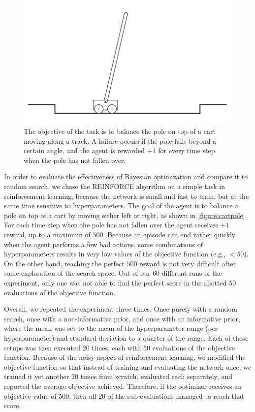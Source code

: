 \begin{figure}[t]
	\begin{center}
		\includegraphics[width=1.0\textwidth]{images/cartpole.png}
		\caption{The objective of the task is to balance the pole on top of a cart moving along
			a track. A failure occurs if the pole falls beyond a certain angle, and the agent
			is rewarded $+1$ for every time step when the pole has not fallen over.}
		\label{figure:cartpole}
	\end{center}
\end{figure}

In order to evaluate the effectiveness of Bayesian optimization and compare it to random search, we chose the REINFORCE algorithm on a simple task in reinforcement learning, because the network is small and fast to train, but at the same time sensitive to hyperparameters. The goal of the agent is to balance a pole on top of a cart by moving either left or right, as shown in \autoref{figure:cartpole}. For each time step when the pole has not fallen over the agent receives $+1$ reward, up to a maximum of $500$. Because an episode can end rather quickly when the agent performs a few bad actions, some combinations of hyperparameters results in very low values of the objective function (e.g., $< 50$). On the other hand, reaching the perfect $500$ reward is not very difficult after some exploration of the search space. Out of our $60$ different runs of the experiment, only one was not able to find the perfect score in the allotted $50$ evaluations of the objective function.

Overall, we repeated the experiment three times. Once purely with a random search, once with a non-informative prior, and once with an informative prior, where the mean was set to the mean of the hyperparameter range (per hyperparameter) and standard deviation to a quarter of the range. Each of these setups was then executed $20$ times, each with $50$ evaluations of the objective function. Because of the noisy aspect of reinforcement learning, we modified the objective function so that instead of training and evaluating the network once, we trained it yet another $20$ times from scratch, evaluated each separately, and reported the average objective achieved. Therefore, if the optimizer receives an objective value of $500$, then all $20$ of the sub-evaluations managed to reach that score.

